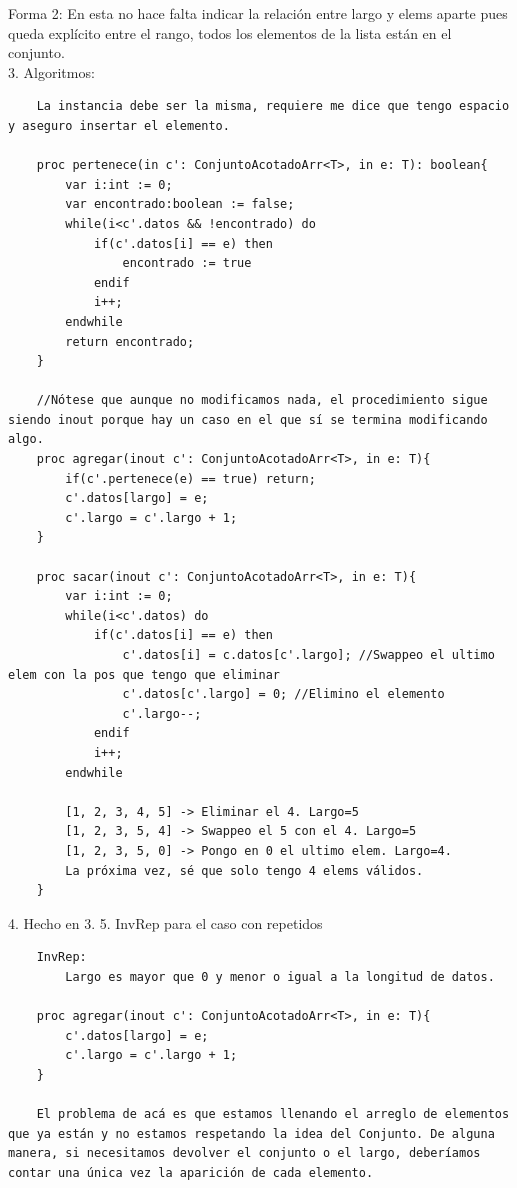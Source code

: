 \documentclass[10pt,a4paper]{article}
\begin{document}
Forma 2: En esta no hace falta indicar la relación entre largo y elems aparte pues queda explícito entre el rango, todos los elementos de la lista están en el conjunto. \\
3. Algoritmos: 
\begin{lstlisting}
    La instancia debe ser la misma, requiere me dice que tengo espacio y aseguro insertar el elemento.

    proc pertenece(in c': ConjuntoAcotadoArr<T>, in e: T): boolean{
        var i:int := 0;
        var encontrado:boolean := false;
        while(i<c'.datos && !encontrado) do
            if(c'.datos[i] == e) then
                encontrado := true
            endif
            i++;
        endwhile
        return encontrado; 
    }
    
    //Nótese que aunque no modificamos nada, el procedimiento sigue siendo inout porque hay un caso en el que sí se termina modificando algo.
    proc agregar(inout c': ConjuntoAcotadoArr<T>, in e: T){
        if(c'.pertenece(e) == true) return; 
        c'.datos[largo] = e;
        c'.largo = c'.largo + 1; 
    }

    proc sacar(inout c': ConjuntoAcotadoArr<T>, in e: T){
        var i:int := 0;
        while(i<c'.datos) do
            if(c'.datos[i] == e) then
                c'.datos[i] = c.datos[c'.largo]; //Swappeo el ultimo elem con la pos que tengo que eliminar
                c'.datos[c'.largo] = 0; //Elimino el elemento
                c'.largo--;
            endif 
            i++;
        endwhile 

        [1, 2, 3, 4, 5] -> Eliminar el 4. Largo=5
        [1, 2, 3, 5, 4] -> Swappeo el 5 con el 4. Largo=5
        [1, 2, 3, 5, 0] -> Pongo en 0 el ultimo elem. Largo=4.
        La próxima vez, sé que solo tengo 4 elems válidos.
    }
\end{lstlisting}
4. Hecho en 3.
5. InvRep para el caso con repetidos 
\begin{lstlisting}
    InvRep:
        Largo es mayor que 0 y menor o igual a la longitud de datos.
        
    proc agregar(inout c': ConjuntoAcotadoArr<T>, in e: T){
        c'.datos[largo] = e;
        c'.largo = c'.largo + 1; 
    }

    El problema de acá es que estamos llenando el arreglo de elementos que ya están y no estamos respetando la idea del Conjunto. De alguna manera, si necesitamos devolver el conjunto o el largo, deberíamos contar una única vez la aparición de cada elemento.

\end{lstlisting}
\end{document}
